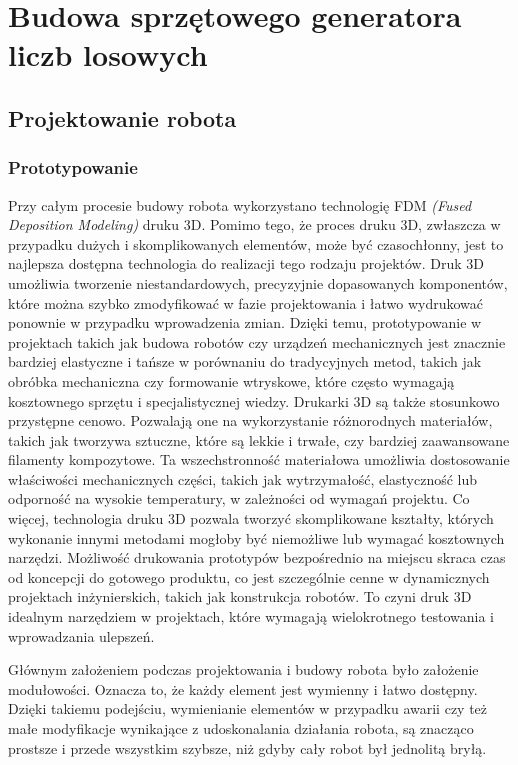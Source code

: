 
\chapter{Budowa sprzętowego generatora liczb losowych}\label{ch:budowa-sprzetowego-generatora}


\section{Projektowanie robota}
\subsection{Prototypowanie}

Przy całym procesie budowy robota wykorzystano technologię FDM \textit{(Fused Deposition Modeling)} druku 3D. Pomimo tego, że proces druku 3D, zwłaszcza w przypadku dużych i skomplikowanych elementów, może być czasochłonny, jest to najlepsza dostępna
technologia do realizacji tego rodzaju projektów. Druk 3D umożliwia tworzenie niestandardowych, precyzyjnie dopasowanych komponentów, które można 
szybko zmodyfikować w fazie projektowania i łatwo wydrukować ponownie w przypadku wprowadzenia zmian. Dzięki temu, prototypowanie w projektach takich 
jak budowa robotów czy urządzeń mechanicznych jest znacznie bardziej elastyczne i tańsze w porównaniu do tradycyjnych metod, takich jak obróbka 
mechaniczna czy formowanie wtryskowe, które często wymagają kosztownego sprzętu i specjalistycznej wiedzy.
Drukarki 3D są także stosunkowo przystępne cenowo. Pozwalają one na wykorzystanie różnorodnych materiałów, takich jak tworzywa sztuczne, które są lekkie 
i trwałe, czy bardziej zaawansowane filamenty kompozytowe. Ta wszechstronność materiałowa umożliwia dostosowanie właściwości mechanicznych części, takich 
jak wytrzymałość, elastyczność lub odporność na wysokie temperatury, w zależności od wymagań projektu.
Co więcej, technologia druku 3D pozwala tworzyć skomplikowane kształty, których wykonanie innymi metodami mogłoby być niemożliwe lub wymagać kosztownych 
narzędzi. Możliwość drukowania prototypów bezpośrednio na miejscu skraca czas od koncepcji do gotowego produktu, co jest szczególnie cenne w dynamicznych 
projektach inżynierskich, takich jak konstrukcja robotów. To czyni druk 3D idealnym narzędziem w projektach, które wymagają wielokrotnego 
testowania i wprowadzania ulepszeń.

Głównym założeniem podczas projektowania i budowy robota było założenie modułowości. Oznacza to, że każdy element jest wymienny i łatwo dostępny.
Dzięki takiemu podejściu, wymienianie elementów w przypadku awarii czy też małe modyfikacje wynikające z udoskonalania działania robota,
są znacząco prostsze i przede wszystkim szybsze, niż gdyby cały robot był jednolitą bryłą.

